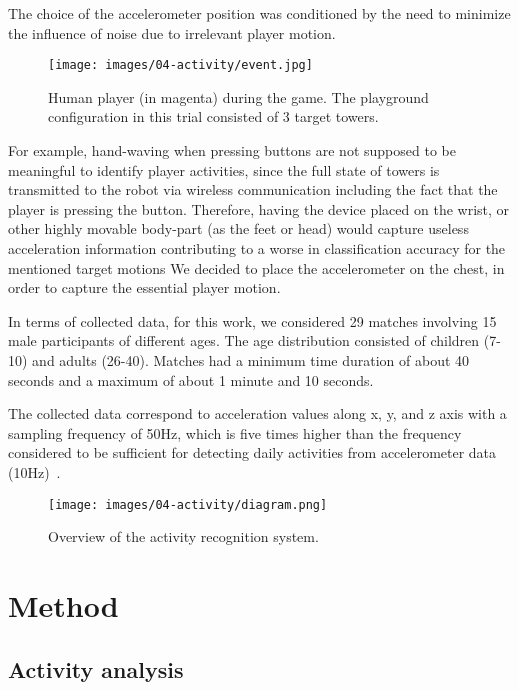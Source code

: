 The choice of the accelerometer position was conditioned by the need to minimize the influence of noise due to irrelevant player motion.

\begin{figure}[thpb]
      \centering
      {\texttt{[image: images/04-activity/event.jpg]}}
      \caption{Human player (in magenta) during the game. The playground configuration in this trial consisted of 3 target towers.}
      \label{game}
\end{figure}

For example, hand-waving when pressing buttons are not supposed to be meaningful to identify player activities, since the full state of towers is transmitted to the robot via wireless communication including the fact that the player is pressing the button. Therefore, having the device placed on the wrist, or other highly movable body-part (as the feet or head) would capture useless acceleration information contributing to a worse in classification accuracy for the mentioned target motions %
We decided to place the accelerometer on the chest, in order to capture the essential player motion.

In terms of collected data, for this work, we considered 29 matches involving 15 male participants of different ages. The age distribution consisted of children (7-10) and adults (26-40). Matches had a minimum time duration of about 40 seconds and a maximum of about 1 minute and 10 seconds. 

The collected data correspond to acceleration values along x, y, and z axis with a sampling frequency of 50Hz, which is five times higher than the frequency considered to be sufficient for detecting daily activities from accelerometer data (10Hz)~\cite{atallah_sensor_2010, ravi_activity_2005, kikhia_analyzing_2014}.

\begin{figure*}[!t]
\normalsize
      \centering
      {\texttt{[image: images/04-activity/diagram.png]}}
      \caption{Overview of the activity recognition system.}
      \label{approach}
\end{figure*}
  
\section{Method}
\subsection{Activity analysis}\label{activityanalysis}

